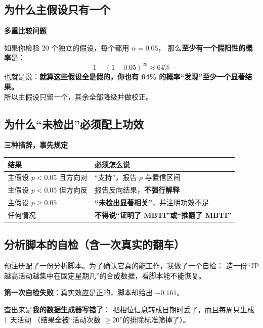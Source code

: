 \documentclass[UTF8,a4paper,11pt]{ctexart}
\newenvironment{explainbox}[1]
{\begin{center}\begin{minipage}{0.94\textwidth}\colorbox{boxbg}{\parbox{0.92\textwidth}{\textbf{#1}\par\vspace{2pt}}}}
{\end{minipage}\end{center}}
\begin{document}
\subsection{为什么主假设只有一个}

\begin{explainbox}{多重比较问题}
如果你检验 20 个独立的假设，每个都用 $\alpha = 0.05$，
那么\textbf{至少有一个假阳性的概率}是：
\begin{equation}
1 - (1-0.05)^{20} \approx 64\%
\end{equation}
也就是说：\textbf{就算这些假设全是假的，你也有 64\% 的概率“发现”至少一个显著结果。}\\[4pt]
所以主假设只留一个，其余全部降级并做校正。
\end{explainbox}

\subsection{为什么“未检出”必须配上功效}

\begin{explainbox}{三种措辞，事先规定}
\begin{center}
\begin{tabular}{p{4.2cm}p{8.6cm}}
\toprule
\textbf{结果} & \textbf{必须怎么说} \\
\midrule
主假设 $p<0.05$ 且方向对 & “支持”，报告 $\rho$ 与置信区间 \\
主假设 $p<0.05$ 但方向反 & 报告反向结果，\textbf{不强行解释} \\
主假设 $p \ge 0.05$ & \textbf{“未检出显著相关”}，并注明功效不足 \\
任何情况 & \textbf{不得说“证明了 MBTI”或“推翻了 MBTI”} \\
\bottomrule
\end{tabular}
\end{center}
\end{explainbox}

\subsection{分析脚本的自检（含一次真实的翻车）}

预注册配了一份分析脚本。为了确认它真的能工作，我做了一个自检：
造一份“JP 越高活动越集中在固定星期几”的合成数据，看脚本能不能恢复。

\textbf{第一次自检失败}：真实效应是正的，脚本却给出 $-0.161$。

查出来是\textbf{我的数据生成器写错了}：
把相位信息转成日期时丢了，而且每周只生成 1 天活动
（结果全被“活动次数 $\ge 20$”的排除标准筛掉了）。
\end{document}
